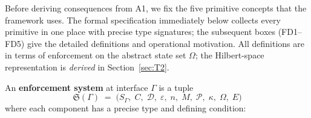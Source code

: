 \documentclass[11pt]{article}
\theoremstyle{remark}
\begin{document}
Before deriving consequences from A1, we fix the five primitive concepts that the framework uses.  The formal specification immediately below collects every primitive in one place with precise type signatures; the subsequent boxes (FD1--FD5) give the detailed definitions and operational motivation.  All definitions are in terms of enforcement on the abstract state set $\Omega$; the Hilbert-space representation is \emph{derived} in Section~\ref{sec:T2}.

\begin{tcolorbox}[defbox, title={Formal Specification I: Enforcement Primitives at Interface $\Gamma$}]
\label{box:formal_spec}

An \textbf{enforcement system} at interface $\Gamma$ is a tuple
\[
\mathfrak{S}(\Gamma) \;=\; \bigl(S_\Gamma,\; C,\; \mathcal{D},\; \varepsilon,\; n,\; M,\; \mathcal{P},\; \kappa,\; \Omega,\; E\bigr)
\]
where each component has a precise type and defining condition:


\end{tcolorbox}
\end{document}
